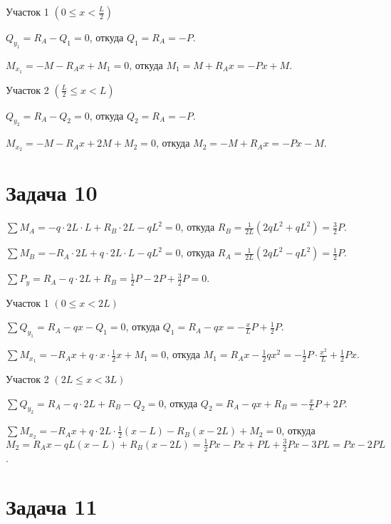 \vspace{1.5ex}

Участок 1 $ \left(0 \le x < \frac{L}{2}\right) $

$ Q_{y_1} = R_A - Q_1 = 0 $,
откуда $ Q_1 = R_A = -P $.

$ M_{x_1} = -M - R_A x + M_1 = 0 $,
откуда $ M_1 = M + R_A x = -Px + M $.

\vspace{1.5ex}

Участок 2 $ \left(\frac{L}{2} \le x < L\right) $

$ Q_{y_2} = R_A - Q_2 = 0 $,
откуда $ Q_2 = R_A = -P $.

$ M_{x_2} = -M - R_A x + 2M + M_2 = 0 $,
откуда $ M_2 = -M + R_A x = -Px - M $.

\section{Задача 10}

$ \sum M_A = -q \cdot 2L \cdot L + R_B \cdot 2L - qL^2 = 0 $,
откуда $ R_B = \frac{1}{2L}\left(2qL^2 + qL^2\right) = \frac{3}{2}P $.

$ \sum M_B = -R_A \cdot 2L + q \cdot 2L \cdot L - qL^2 = 0 $,
откуда $ R_A = \frac{1}{2L}\left(2qL^2 - qL^2\right) = \frac{1}{2}P $.

$ \sum P_y = R_A - q \cdot 2L + R_B = \frac{1}{2}P - 2P + \frac{3}{2}P = 0 $.

\vspace{1.5ex}

Участок 1 $ \left(0 \le x < 2L\right) $

$ \sum Q_{y_1} = R_A - qx - Q_1 = 0 $,
откуда $ Q_1 = R_A - qx = -\frac{x}{L}P + \frac{1}{2}P $.

$ \sum M_{x_1} = -R_A x + q \cdot x \cdot \frac{1}{2}x + M_1 = 0 $,
откуда $ M_1 = R_A x - \frac{1}{2}qx^2 = -\frac{1}{2}P \cdot \frac{x^2}{L} + \frac{1}{2}Px $.

\vspace{1.5ex}

Участок 2 $ \left(2L \le x < 3L\right) $

$ \sum Q_{y_2} = R_A - q \cdot 2L + R_B - Q_2 = 0 $,
откуда $ Q_2 = R_A - qx + R_B = -\frac{x}{L}P + 2P $.

$ \sum M_{x_2} = -R_A x + q \cdot 2L \cdot \frac{1}{2}(x - L) - R_B (x - 2L) + M_2 = 0 $,
откуда $ M_2 = R_A x - qL(x - L) + R_B (x - 2L) = \frac{1}{2}Px - Px + PL + \frac{3}{2}Px - 3PL = Px - 2PL $.


\section{Задача 11}

